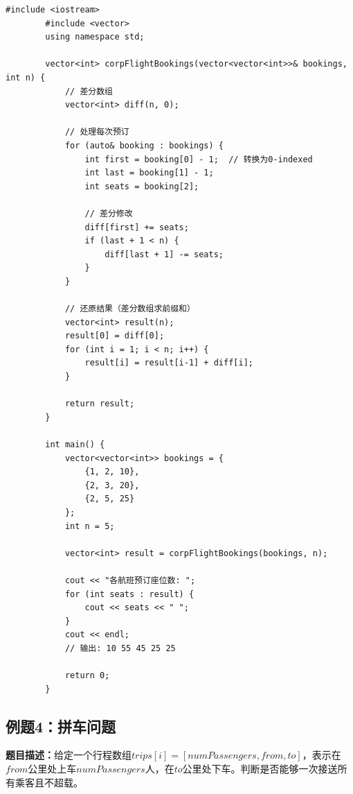 \documentclass[12pt,a4paper]{article}
\begin{document}
	\begin{lstlisting}[caption={例题3：航班预订统计 - 差分数组}]
		#include <iostream>
		#include <vector>
		using namespace std;
		
		vector<int> corpFlightBookings(vector<vector<int>>& bookings, int n) {
			// 差分数组
			vector<int> diff(n, 0);
			
			// 处理每次预订
			for (auto& booking : bookings) {
				int first = booking[0] - 1;  // 转换为0-indexed
				int last = booking[1] - 1;
				int seats = booking[2];
				
				// 差分修改
				diff[first] += seats;
				if (last + 1 < n) {
					diff[last + 1] -= seats;
				}
			}
			
			// 还原结果（差分数组求前缀和）
			vector<int> result(n);
			result[0] = diff[0];
			for (int i = 1; i < n; i++) {
				result[i] = result[i-1] + diff[i];
			}
			
			return result;
		}
		
		int main() {
			vector<vector<int>> bookings = {
				{1, 2, 10},
				{2, 3, 20},
				{2, 5, 25}
			};
			int n = 5;
			
			vector<int> result = corpFlightBookings(bookings, n);
			
			cout << "各航班预订座位数: ";
			for (int seats : result) {
				cout << seats << " ";
			}
			cout << endl;
			// 输出: 10 55 45 25 25
			
			return 0;
		}
	\end{lstlisting}
	
	\subsection{例题4：拼车问题}
	
	\textbf{题目描述：}给定一个行程数组$trips[i] = [numPassengers, from, to]$，表示在$from$公里处上车$numPassengers$人，在$to$公里处下车。判断是否能够一次接送所有乘客且不超载。
	
\end{document}
